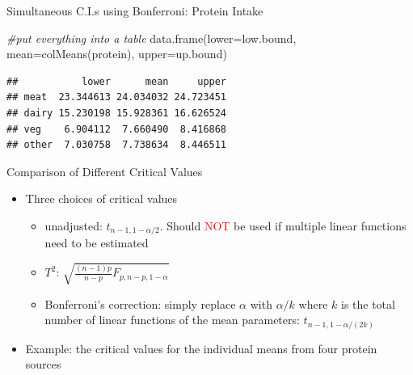 \documentclass[
  ignorenonframetext,
]{beamer}
\newenvironment{Shaded}{\begin{snugshade}}{\end{snugshade}}
\newcommand{\AttributeTok}[1]{\textcolor[rgb]{0.77,0.63,0.00}{#1}}
\newcommand{\CommentTok}[1]{\textcolor[rgb]{0.56,0.35,0.01}{\textit{#1}}}
\newcommand{\FunctionTok}[1]{\textcolor[rgb]{0.00,0.00,0.00}{#1}}
\newcommand{\NormalTok}[1]{#1}
\providecommand{\tightlist}{%
  \setlength{\itemsep}{0pt}\setlength{\parskip}{0pt}}
\begin{document}
\begin{frame}[fragile]{Simultaneous C.I.s using Bonferroni: Protein
Intake}
\protect\hypertarget{simultaneous-c.i.s-using-bonferroni-protein-intake-1}{}
\begin{Shaded}
\begin{Highlighting}[]
\CommentTok{\#put everything into a table}
\FunctionTok{data.frame}\NormalTok{(}\AttributeTok{lower=}\NormalTok{low.bound, }\AttributeTok{mean=}\FunctionTok{colMeans}\NormalTok{(protein), }
           \AttributeTok{upper=}\NormalTok{up.bound)}
\end{Highlighting}
\end{Shaded}

\begin{verbatim}
##           lower      mean     upper
## meat  23.344613 24.034032 24.723451
## dairy 15.230198 15.928361 16.626524
## veg    6.904112  7.660490  8.416868
## other  7.030758  7.738634  8.446511
\end{verbatim}
\end{frame}

\begin{frame}{Comparison of Different Critical Values}
\protect\hypertarget{comparison-of-different-critical-values}{}
\begin{itemize}
\tightlist
\item
  Three choices of critical values

  \begin{itemize}
  \tightlist
  \item
    unadjusted: \(t_{n-1, 1-\alpha/2}\). Should \textcolor{red}{NOT} be
    used if multiple linear functions need to be estimated
  \item
    \(T^2\): \(\sqrt{\frac{(n-1)p}{n-p}F_{p, n-p, 1-\alpha}}\)
  \item
    Bonferroni's correction: simply replace \(\alpha\) with \(\alpha/k\)
    where \(k\) is the total number of linear functions of the mean
    parameters: \(t_{n-1, 1-\alpha/(2k)}\)
  \end{itemize}
\item
  Example: the critical values for the individual means from four
  protein sources
\end{itemize}
\end{frame}
\end{document}
